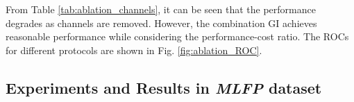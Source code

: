 \documentclass[journal]{IEEEtran}
\begin{document}
\begin{table}[h!]

\centering
\caption{ Performance of the proposed framework with different combinations of channels in all protocols of \textit{WMCA} dataset. The values reported are obtained with a threshold computed for BPCER 1\% in $dev$ set.}
\label{tab:ablation_channels}

\end{table}


From Table \ref{tab:ablation_channels}, it can be seen that the performance degrades as channels are removed. However, the combination GI achieves reasonable performance while considering the performance-cost ratio. The ROCs for different protocols are shown in Fig. \ref{fig:ablation_ROC}.





\subsection{Experiments and Results in \textit{MLFP} dataset}
\end{document}

